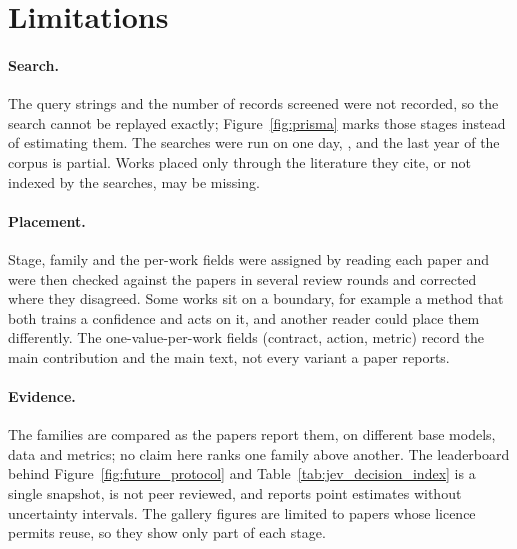 \section{Limitations}
\label{sec:limitations}

\paragraph{Search.} The query strings and the number of records screened were not recorded, so the
search cannot be replayed exactly; Figure~\ref{fig:prisma} marks those stages instead of estimating
them. The \nStreams searches were run on one day, \searchDate, and the last year of the corpus is
partial. Works placed only through the literature they cite, or not indexed by the searches, may be
missing.

\paragraph{Placement.} Stage, family and the per-work fields were assigned by reading each paper and were
then checked against the papers in several review rounds and corrected where they disagreed. Some
works sit on a boundary, for example a method that both trains a confidence and acts on it, and another
reader could place them differently. The one-value-per-work fields (contract, action, metric) record the
main contribution and the main text, not every variant a paper reports.

\paragraph{Evidence.} The families are compared as the papers report them, on different base models,
data and metrics; no claim here ranks one family above another. The leaderboard behind
Figure~\ref{fig:future_protocol} and Table~\ref{tab:jev_decision_index} is a single snapshot, is not peer
reviewed, and reports point estimates without uncertainty intervals. The gallery figures are limited to
papers whose licence permits reuse, so they show only part of each stage.
